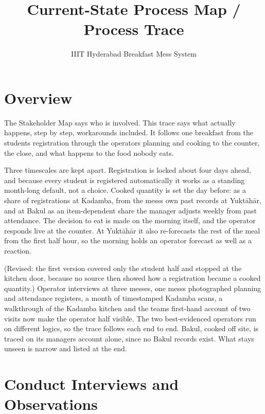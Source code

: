 \documentclass[
  10pt,
  table]{article}
\title{Current-State Process Map / Process Trace}
\subtitle{IIIT Hyderabad Breakfast Mess System}
\author{}
\date{}
\makeatletter
\gdef\psubtitle{}
\renewcommand{\maketitle}{%
  \begingroup\raggedright
  {\color{pblue}\fontsize{24}{27}\selectfont\bfseries \@title\par}
  \vspace{3pt}{\color{pblue}\rule{\linewidth}{2.4pt}}\par\vspace{5pt}
  {\color{pslate}\large \psubtitle\par}
  \vspace{4pt}
  \endgroup}
\makeatother
\begin{document}
\maketitle

\renewcommand*\contentsname{Contents}
{
\hypersetup{linkcolor=pslate}
\setcounter{tocdepth}{2}
\tableofcontents
}
\section{Overview}\label{overview}

The Stakeholder Map says who is involved. This trace says what actually happens, step by step, workarounds included. It follows one breakfast from the student\textquotesingle s registration through the operator\textquotesingle s planning and cooking to the counter, the close, and what happens to the food nobody eats.

Three timescales are kept apart. Registration is locked about four days ahead, and because every student is registered automatically it works as a standing month-long default, not a choice. Cooked quantity is set the day before: as a share of registrations at Kadamba, from the mess\textquotesingle s own past records at Yuktāhār, and at Bakul as an item-dependent share the manager adjusts weekly from past attendance. The decision to eat is made on the morning itself, and the operator responds live at the counter. At Yuktāhār it also re-forecasts the rest of the meal from the first half hour, so the morning holds an operator forecast as well as a reaction.

(Revised: the first version covered only the student half and stopped at the kitchen door, because no source then showed how a registration became a cooked quantity.) Operator interviews at three messes, one mess\textquotesingle s photographed planning and attendance registers, a month of timestamped Kadamba scans, a walkthrough of the Kadamba kitchen and the team\textquotesingle s first-hand account of two visits now make the operator half visible. The two best-evidenced operators run on different logics, so the trace follows each end to end. Bakul, cooked off site, is traced on its manager\textquotesingle s account alone, since no Bakul records exist. What stays unseen is narrow and listed at the end.

\section{Conduct Interviews and Observations}\label{conduct-interviews-and-observations}
\end{document}
